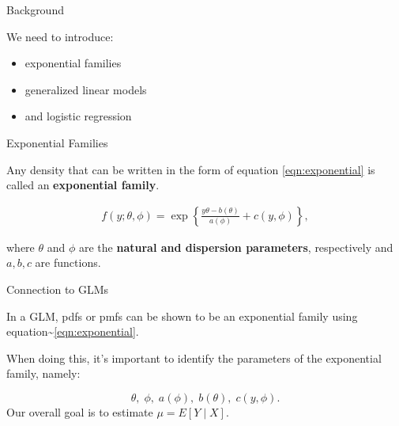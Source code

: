\documentclass[
  ignorenonframetext,
]{beamer}
\providecommand{\tightlist}{%
  \setlength{\itemsep}{0pt}\setlength{\parskip}{0pt}}
\begin{document}
\begin{frame}{Background}
\protect\hypertarget{background}{}

We need to introduce:

\begin{itemize}
\tightlist
\item
  exponential families
\item
  generalized linear models
\item
  and logistic regression
\end{itemize}

\end{frame}

\begin{frame}{Exponential Families}
\protect\hypertarget{exponential-families}{}

Any density that can be written in the form of equation
\ref{eqn:exponential} is called an \textbf{exponential family}.

\begin{align}
\label{eqn:exponential}
f(y; \theta, \phi) = \exp\left\{ \frac{y\theta - b(\theta)}{a(\phi)} + c(y,\phi) \right\},
\end{align}

where \(\theta\) and \(\phi\) are the \textbf{natural and dispersion
parameters}, respectively and \(a,b,c\) are functions.

\end{frame}

\begin{frame}{Connection to GLMs}
\protect\hypertarget{connection-to-glms}{}

In a GLM, pdfs or pmfs can be shown to be an exponential family using
equation\textasciitilde{}\ref{eqn:exponential}.

When doing this, it's important to identify the parameters of the
exponential family, namely:

\[\theta, \; \phi, \; a(\phi),\; b(\theta),\; c(y,\phi).\] Our overall
goal is to estimate \(\mu = E[Y \mid X].\)

\end{frame}
\end{document}
